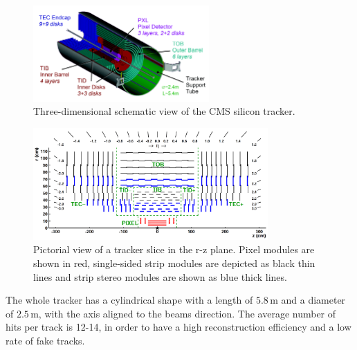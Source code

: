 \begin{figure}[htb]
\centering
\includegraphics[width=0.6\textwidth]{images/tracker.pdf}
\caption{Three-dimensional schematic view of the CMS silicon tracker.}\label{fig:tracker3D}
\end{figure}
\begin{figure}[htb]
\centering
\includegraphics[width=0.8\textwidth]{images/tracker2D.pdf}
\caption{Pictorial view of a tracker slice in the r-z plane. Pixel modules are
shown in red, single-sided strip modules are depicted as black thin lines and
strip stereo modules are shown as blue thick lines.}\label{fig:tracker2D}
\end{figure}

The whole tracker has a cylindrical shape with a length of $5.8$\,m and a diameter of $2.5$\,m, with the axis aligned to the beams direction. The average number of hits per track is 12-14, in order to have a high reconstruction efficiency and a low rate of fake tracks.


